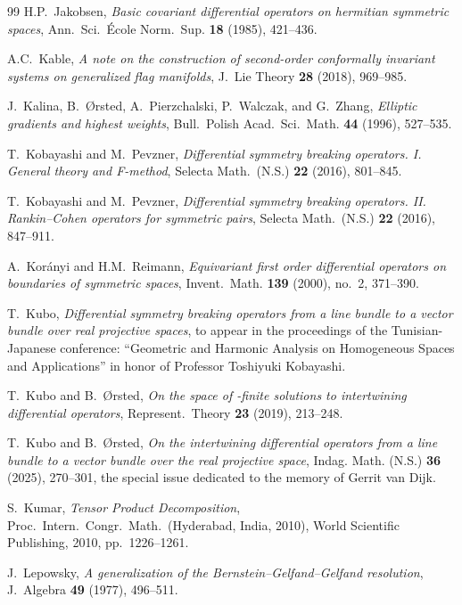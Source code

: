 \documentclass[reqno,11pt]{amsart}
\theoremstyle{remark}
\numberwithin{equation}{section}
\begin{document}
\begin{thebibliography}{99}
H.P.~Jakobsen, \emph{Basic covariant differential operators on hermitian
  symmetric spaces}, Ann.~Sci.~\'Ecole Norm.~Sup. \textbf{18} (1985), 421--436.

A.C.~Kable, \emph{{A note on the construction of second-order conformally
  invariant systems on generalized flag manifolds}}, J.\ Lie Theory \textbf{28}
  (2018), 969--985.

J.~Kalina, B.~{\O}rsted, A.~Pierzchalski, P.~Walczak, and G.~Zhang,
  \emph{{Elliptic gradients and highest weights}}, Bull.\ Polish Acad.\ Sci.\
  Math. \textbf{44} (1996), 527--535.

T.~Kobayashi and M.~Pevzner, \emph{Differential symmetry breaking operators.
  {I}. {G}eneral theory and {F}-method}, Selecta Math.~(N.S.) \textbf{22}
  (2016), 801--845.

T.~Kobayashi and M.~Pevzner, \emph{Differential symmetry breaking operators. {II}.
  {R}ankin--{C}ohen operators for symmetric pairs}, Selecta Math.~(N.S.)
  \textbf{22} (2016), 847--911.

A.~Kor\'anyi and H.M.~Reimann, \emph{Equivariant first order differential
  operators on boundaries of symmetric spaces}, Invent.~Math. \textbf{139}
  (2000), no.~2, 371--390.

T.~Kubo, \emph{{Differential symmetry breaking operators from a line bundle to
  a vector bundle over real projective spaces}}, to appear in the proceedings
  of the Tunisian-Japanese conference: ``Geometric and Harmonic Analysis on
  Homogeneous Spaces and Applications'' in honor of Professor Toshiyuki
  Kobayashi.

T.~Kubo and B.~\O rsted, \emph{On the space of -finite solutions to
  intertwining differential operators}, Represent.\ Theory \textbf{23} (2019),
  213--248.

T.~Kubo and B.~\O rsted, \emph{{On the intertwining differential operators from
  a line bundle to a vector bundle over the real projective space}}, Indag.
  Math. (N.S.) \textbf{36} (2025), 270--301, the special issue dedicated to the
  memory of Gerrit van Dijk.

S.~Kumar, \emph{{Tensor Product Decomposition}}, Proc.\ Intern.\ Congr.\ Math.\
  (Hyderabad, India, 2010), World Scientific Publishing, 2010, pp.~1226--1261.

\bibitem{Lepowsky77}
J.~Lepowsky, \emph{{A generalization of the Bernstein--Gelfand--Gelfand
  resolution}}, J.~Algebra \textbf{49} (1977), 496--511.


\end{thebibliography}
\end{document}
